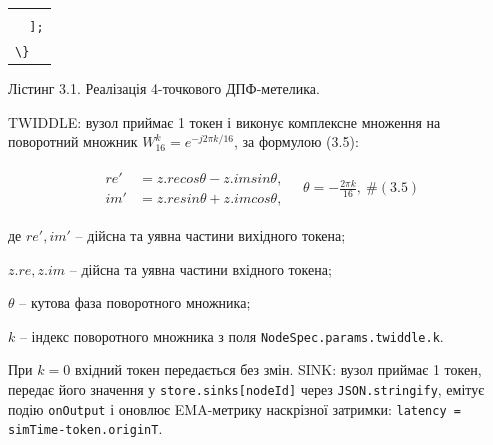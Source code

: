 \documentclass[
]{article}
\newcommand{\passthrough}[1]{#1}
\begin{document}
\begin{longtable}[]{@{}
  >{\raggedright\arraybackslash}p{}@{}}
\begin{minipage}[t]{\linewidth}
\passthrough{\lstinline!    !}\passthrough{\lstinline!cplxAdd!}\passthrough{\lstinline!(!}\passthrough{\lstinline!E!}\passthrough{\lstinline!1,!}\passthrough{\lstinline! !}\passthrough{\lstinline!cplxMulJ!}\passthrough{\lstinline!(!}\passthrough{\lstinline!O!}\passthrough{\lstinline!1))!}\passthrough{\lstinline!       !}\passthrough{\lstinline!//!}\passthrough{\lstinline! !}\passthrough{\lstinline!X!}\passthrough{\lstinline!3!}\passthrough{\lstinline! !}\passthrough{\lstinline!=!}\passthrough{\lstinline! !}\passthrough{\lstinline!E!}\passthrough{\lstinline!1!}\passthrough{\lstinline! !}\passthrough{\lstinline!+!}\passthrough{\lstinline! !}\passthrough{\lstinline!j!}\passthrough{\lstinline!*!}\passthrough{\lstinline!O!}\passthrough{\lstinline!1!}\strut \\
\passthrough{\lstinline!  !}\passthrough{\lstinline!];!}\strut \\
\passthrough{\lstinline!\}!}\strut
\end{minipage} \\
\end{longtable}

Лістинг 3.1. Реалізація 4-точкового ДПФ-метелика.

TWIDDLE: вузол приймає 1 токен і виконує комплексне множення на
поворотний множник \(W_{16}^{k} = e^{- j2\pi k/16}\), за формулою (3.5):

\[\begin{array}{r}
\begin{aligned}
{re}' & = z.recos\theta - z.imsin\theta, \\
{im}' & = z.resin\theta + z.imcos\theta,
\end{aligned}\quad\theta = - \frac{2\pi k}{16},\ \#(3.5)
\end{array}\]

де \({re}',{im}'\) -- дійсна та уявна частини вихідного токена;

\(z.re,z.im\) -- дійсна та уявна частини вхідного токена;

\(\theta\) -- кутова фаза поворотного множника;

\(k\) -- індекс поворотного множника з поля
\passthrough{\lstinline!NodeSpec.params.twiddle.k!}.

При \(k = 0\) вхідний токен передається без змін. SINK: вузол приймає 1
токен, передає його значення у
\passthrough{\lstinline!store!}\passthrough{\lstinline!.!}\passthrough{\lstinline!sinks!}\passthrough{\lstinline![!}\passthrough{\lstinline!nodeId!}\passthrough{\lstinline!]!}
через
\passthrough{\lstinline!JSON!}\passthrough{\lstinline!.!}\passthrough{\lstinline!stringify!},
емітує подію \passthrough{\lstinline!onOutput!} і оновлює EMA-метрику
наскрізної затримки:
\passthrough{\lstinline!latency!}\passthrough{\lstinline! !}\passthrough{\lstinline!=!}\passthrough{\lstinline! !}\passthrough{\lstinline!simTime!}\passthrough{\lstinline!-!}\passthrough{\lstinline!token!}\passthrough{\lstinline!.!}\passthrough{\lstinline!originT!}.
\end{document}
